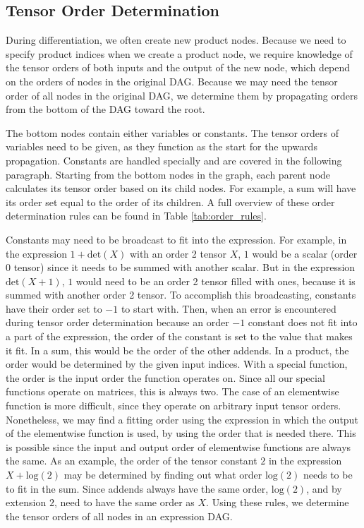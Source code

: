 \documentclass[12pt, a4paper]{report} %
\begin{document}
\subsection{Tensor Order Determination}
During differentiation, we often create new product nodes.
Because we need to specify product indices when we create a product node, we require knowledge of the tensor orders of both inputs and the output of the new node, which depend on the orders of nodes in the original DAG.
Because we may need the tensor order of all nodes in the original DAG, we determine them by propagating orders from the bottom of the DAG toward the root.

The bottom nodes contain either variables or constants.
The tensor orders of variables need to be given, as they function as the start for the upwards propagation.
Constants are handled specially and are covered in the following paragraph.
Starting from the bottom nodes in the graph, each parent node calculates its tensor order based on its child nodes.
For example, a sum will have its order set equal to the order of its children.
A full overview of these order determination rules can be found in Table \ref{tab:order_rules}.

Constants may need to be broadcast to fit into the expression.
For example, in the expression $1 + \text{det}(X)$ with an order 2 tensor $X$, $1$ would be a scalar (order 0 tensor) since it needs to be summed with another scalar.
But in the expression $\text{det}(X + 1)$, $1$ would need to be an order 2 tensor filled with ones, because it is summed with another order 2 tensor.
To accomplish this broadcasting, constants have their order set to $-1$ to start with.
Then, when an error is encountered during tensor order determination because an order $-1$ constant does not fit into a part of the expression, the order of the constant is set to the value that makes it fit.
In a sum, this would be the order of the other addends.
In a product, the order would be determined by the given input indices.
With a special function, the order is the input order the function operates on. Since all our special functions operate on matrices, this is always two.
The case of an elementwise function is more difficult, since they operate on arbitrary input tensor orders.
Nonetheless, we may find a fitting order using the expression in which the output of the elementwise function is used, by using the order that is needed there.
This is possible since the input and output order of elementwise functions are always the same.
As an example, the order of the tensor constant $2$ in the expression $X + \text{log}(2)$ may be determined by finding out what order $\text{log}(2)$ needs to be to fit in the sum.
Since addends always have the same order, $\text{log}(2)$, and by extension $2$, need to have the same order as $X$.
Using these rules, we determine the tensor orders of all nodes in an expression DAG.
\end{document}
